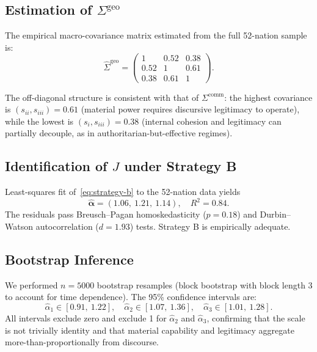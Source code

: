 \documentclass[12pt]{article}
\theoremstyle{plain}
\theoremstyle{definition}
\theoremstyle{remark}
\begin{document}
\subsection{Estimation of $\Sigma^{\text{geo}}$}

The empirical macro-covariance matrix estimated from the full 52-nation sample is:
\begin{equation}\label{eq:sigma-geo}
\hat\Sigma^{\text{geo}} = \begin{pmatrix} 1 & 0.52 & 0.38 \\ 0.52 & 1 & 0.61 \\ 0.38 & 0.61 & 1 \end{pmatrix}.
\end{equation}

The off-diagonal structure is consistent with that of $\Sigma^{\text{comm}}$: the highest covariance is $(s_{ii}, s_{iii}) = 0.61$ (material power requires discursive legitimacy to operate), while the lowest is $(s_i, s_{iii}) = 0.38$ (internal cohesion and legitimacy can partially decouple, as in authoritarian-but-effective regimes).

\subsection{Identification of $J$ under Strategy B}

Least-squares fit of~\eqref{eq:strategy-b} to the 52-nation data yields
\begin{equation}\label{eq:alpha-hat}
\hat{\boldsymbol\alpha} = (1.06,\ 1.21,\ 1.14), \quad R^2 = 0.84.
\end{equation}
The residuals pass Breusch--Pagan homoskedasticity ($p = 0.18$) and Durbin--Watson autocorrelation ($d = 1.93$) tests. Strategy B is empirically adequate.

\subsection{Bootstrap Inference}

We performed $n = 5000$ bootstrap resamples (block bootstrap with block length 3 to account for time dependence). The 95\% confidence intervals are:
\[
\hat\alpha_1 \in [0.91,\ 1.22], \quad
\hat\alpha_2 \in [1.07,\ 1.36], \quad
\hat\alpha_3 \in [1.01,\ 1.28].
\]
All intervals exclude zero and exclude 1 for $\hat\alpha_2$ and $\hat\alpha_3$, confirming that the scale is not trivially identity and that material capability and legitimacy aggregate more-than-proportionally from discourse.
\end{document}

